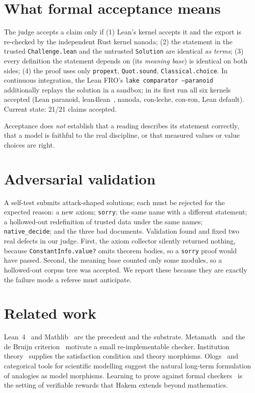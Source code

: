 \documentclass[11pt]{article}
\begin{document}
\section{What formal acceptance means}\label{sec:accept}

The judge accepts a claim only if (1) Lean's kernel accepts it and the export is re-checked by
the independent Rust kernel nanoda; (2) the statement in the trusted \texttt{Challenge.lean}
and the untrusted \texttt{Solution} are identical \emph{as terms}; (3) every definition the
statement depends on (its \emph{meaning base}) is identical on both sides; (4) the proof uses
only \texttt{propext}, \texttt{Quot.sound}, \texttt{Classical.choice}. In continuous
integration, the Lean FRO's \texttt{lake comparator --paranoid} additionally replays the
solution in a sandbox; in its first run all six kernels accepted (Lean paranoid,
lean4lean~\cite{carneiro2024lean4lean}, nanoda, con-leche, con-ron, Lean default).
Current state: 21/21 claims accepted.

Acceptance does \emph{not} establish that a reading describes its statement correctly, that a
model is faithful to the real discipline, or that measured values or value choices are right.

\section{Adversarial validation}

A self-test submits attack-shaped solutions; each must be rejected for the expected reason: a
new axiom; \texttt{sorry}; the same name with a different statement; a hollowed-out
redefinition of trusted data under the same names; \texttt{native\_decide}; and the three bad
documents. Validation found and fixed two real defects in our judge. First, the axiom
collector silently returned nothing, because \texttt{ConstantInfo.value?} omits theorem
bodies, so a \texttt{sorry} proof would have passed. Second, the meaning base counted only some
modules, so a hollowed-out corpus tree was accepted. We report these because they are exactly
the failure mode a referee must anticipate.

\section{Related work}

Lean~4~\cite{demoura2021lean4} and Mathlib~\cite{mathlib2020} are the precedent and the
substrate. Metamath~\cite{megill2019metamath} and the de Bruijn
criterion~\cite{barendregt2005challenge} motivate a small re-implementable checker.
Institution theory~\cite{goguen1992institutions} supplies the satisfaction condition and
theory morphisms. Ologs~\cite{spivak2012ologs} and categorical tools for scientific modelling
suggest the natural long-term formulation of analogies as model morphisms. Learning to prove
against formal checkers~\cite{yang2023leandojo} is the setting of verifiable rewards that
Hakem extends beyond mathematics.
\end{document}
